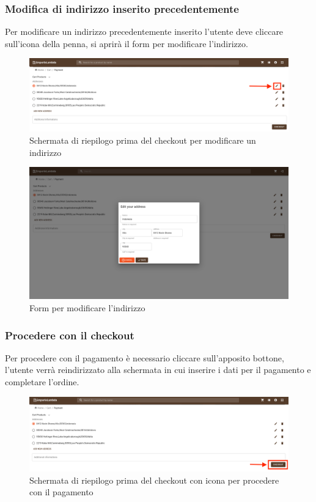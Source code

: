 \subsubsection{Modifica di indirizzo inserito precedentemente}
Per modificare un indirizzo precedentemente inserito l'utente deve cliccare sull'icona della penna, si aprirà il form per modificare l'indirizzo.
\begin{figure}[H]
	\centering
	\includegraphics[scale=0.25]{Immagini/Acquirente/payment.addressmodify.png}
	\caption{Schermata di riepilogo prima del checkout per modificare un indirizzo}
	\label{fig:EditAddress}
\end{figure}
\begin{figure}[H]
	\centering
	\includegraphics[scale=0.25]{Immagini/Acquirente/payment-edit-address.customer.png}
	\caption{Form per modificare l'indirizzo}
	\label{fig:CartEditAddress}
\end{figure}
\subsubsection{Procedere con il checkout}
Per procedere con il pagamento è necessario cliccare sull'apposito bottone, l'utente verrà reindirizzato alla schermata in cui inserire i dati per il pagamento e completare l'ordine.
\begin{figure}[H]
	\centering
	\includegraphics[scale=0.25]{Immagini/Acquirente/payment.checkout.png}
	\caption{Schermata di riepilogo prima del checkout con icona per procedere con il pagamento}
	\label{fig:CartCheckout}
\end{figure}
\newpage
